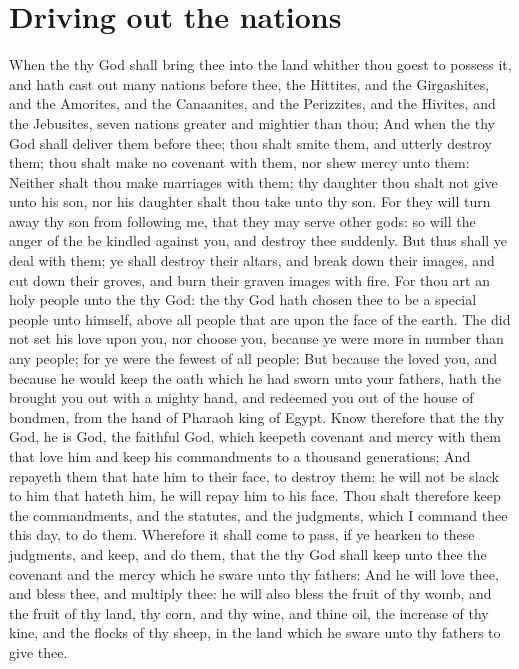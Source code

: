 \section*{Driving out the nations}
\begin{biblechapter} %
\verse When the \LORD thy God shall bring thee into the land whither thou goest to possess it, and hath cast out many nations before thee, the Hittites, and the Girgashites, and the Amorites, and the Canaanites, and the Perizzites, and the Hivites, and the Jebusites, seven nations greater and mightier than thou;
\verse And when the \LORD thy God shall deliver them before thee; thou shalt smite them, and utterly destroy them; thou shalt make no covenant with them, nor shew mercy unto them:
\verse Neither shalt thou make marriages with them; thy daughter thou shalt not give unto his son, nor his daughter shalt thou take unto thy son.
\verse For they will turn away thy son from following me, that they may serve other gods: so will the anger of the \LORD be kindled against you, and destroy thee suddenly.
\verse But thus shall ye deal with them; ye shall destroy their altars, and break down their images, and cut down their groves, and burn their graven images with fire.
\verse For thou art an holy people unto the \LORD thy God: the \LORD thy God hath chosen thee to be a special people unto himself, above all people that are upon the face of the earth.
\verse The \LORD did not set his love upon you, nor choose you, because ye were more in number than any people; for ye were the fewest of all people:
\verse But because the \LORD loved you, and because he would keep the oath which he had sworn unto your fathers, hath the \LORD brought you out with a mighty hand, and redeemed you out of the house of bondmen, from the hand of Pharaoh king of Egypt.
\verse Know therefore that the \LORD thy God, he is God, the faithful God, which keepeth covenant and mercy with them that love him and keep his commandments to a thousand generations;
\verse And repayeth them that hate him to their face, to destroy them: he will not be slack to him that hateth him, he will repay him to his face.
\verse Thou shalt therefore keep the commandments, and the statutes, and the judgments, which I command thee this day, to do them.
\verse Wherefore it shall come to pass, if ye hearken to these judgments, and keep, and do them, that the \LORD thy God shall keep unto thee the covenant and the mercy which he sware unto thy fathers:
\verse And he will love thee, and bless thee, and multiply thee: he will also bless the fruit of thy womb, and the fruit of thy land, thy corn, and thy wine, and thine oil, the increase of thy kine, and the flocks of thy sheep, in the land which he sware unto thy fathers to give thee.

\end{biblechapter}
